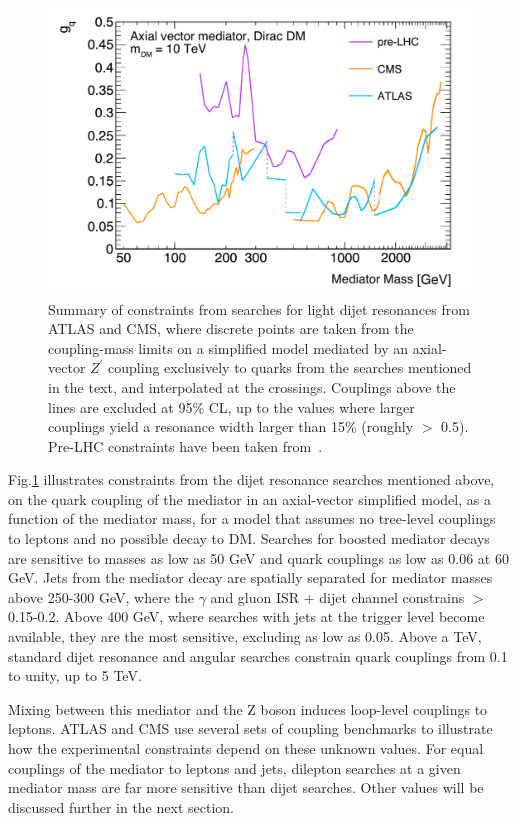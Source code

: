 \begin{figure}[!htpb]
\includegraphics[width=\textwidth]{figures/CouplingMassPlot.pdf}\caption{Summary of constraints from searches for light dijet resonances from ATLAS and CMS, where discrete points are taken from the coupling-mass limits on a simplified model mediated by an axial-vector $Z^\prime$ coupling exclusively to quarks from the searches mentioned in the text, and interpolated at the crossings. Couplings above the lines are excluded at 95\% CL, up to the values where larger couplings yield a resonance width larger than 15\% (roughly \gq $>$ 0.5).  
Pre-LHC constraints have been taken from~\cite{Dobrescu:2013coa}.\label{fig:couplingmass}}
\end{figure}

Fig.\ref{fig:couplingmass} illustrates constraints from the dijet resonance searches mentioned above, on the quark coupling of the mediator in an axial-vector simplified model, as a function of the mediator mass, for a model that assumes no tree-level couplings to leptons and no possible decay to DM.
Searches for boosted mediator decays are sensitive to masses as low as 50 GeV and quark couplings \gq as low as 0.06 at 60 GeV.
Jets from the mediator decay are spatially separated for mediator masses above 250-300 GeV, where the $\gamma$ and gluon ISR + dijet channel constrains \gq$>$0.15-0.2.
Above 400 GeV, where searches with jets at the trigger level become available, they are the most sensitive, excluding \gq as low as 0.05.
Above a TeV, standard dijet resonance and angular searches constrain quark couplings from 0.1 to unity, up to 5 TeV. 

Mixing between this mediator and the Z boson induces loop-level couplings to leptons. ATLAS and CMS use several sets of coupling benchmarks to illustrate how the experimental constraints depend on these unknown values.
For equal couplings of the mediator to leptons and jets, dilepton searches at a given mediator mass are far more sensitive than dijet searches. Other values will be discussed further in the next section.

